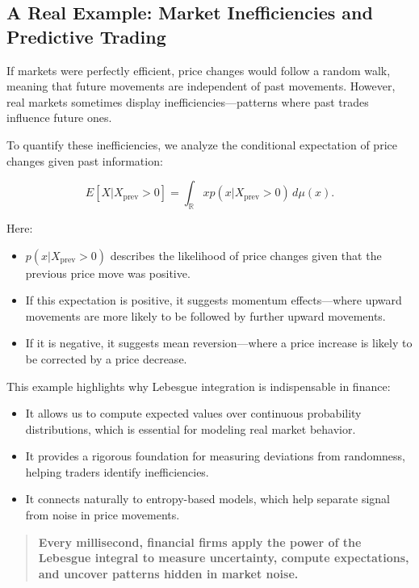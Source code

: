\subsection{A Real Example: Market Inefficiencies and Predictive Trading}

If markets were perfectly efficient, price changes would follow a random walk, meaning that future movements are independent of past movements. However, real markets sometimes display inefficiencies—patterns where past trades influence future ones.

To quantify these inefficiencies, we analyze the conditional expectation of price changes given past information:

\[
E[X | X_{\text{prev}} > 0] = \int_{\mathbb{R}} x p(x | X_{\text{prev}} > 0) \, d\mu(x).
\]

Here:
\begin{itemize}
    \item \( p(x | X_{\text{prev}} > 0) \) describes the likelihood of price changes given that the previous price move was positive.
    \item If this expectation is positive, it suggests momentum effects—where upward movements are more likely to be followed by further upward movements.
    \item If it is negative, it suggests mean reversion—where a price increase is likely to be corrected by a price decrease.
\end{itemize}

This example highlights why Lebesgue integration is indispensable in finance:

\begin{itemize}
    \item It allows us to compute expected values over continuous probability distributions, which is essential for modeling real market behavior.
    \item It provides a rigorous foundation for measuring deviations from randomness, helping traders identify inefficiencies.
    \item It connects naturally to entropy-based models, which help separate signal from noise in price movements.
\end{itemize}

\begin{quote}
\textbf{Every millisecond, financial firms apply the power of the Lebesgue integral to measure uncertainty, compute expectations, and uncover patterns hidden in market noise.}
\end{quote}





